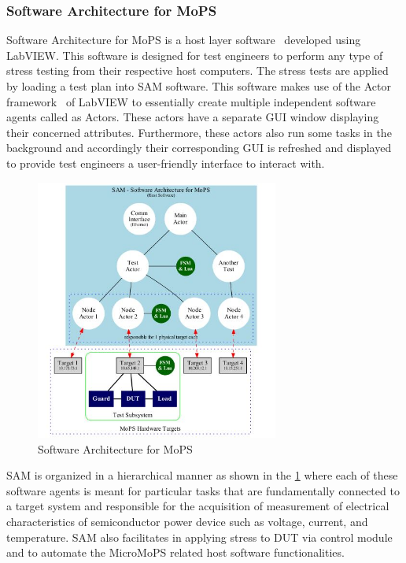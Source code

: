 \subsubsection{Software Architecture for MoPS}\label{sec:SAM}
Software Architecture for MoPS is a host layer software~\cite{Steinwender2016} developed using LabVIEW.
This software is designed for test engineers to perform any type of stress testing from their respective host computers.
The stress tests are applied by loading a test plan into SAM software. 
This software makes use of the Actor framework~\cite{ActorFramework2012} of LabVIEW to essentially create multiple independent software agents called as Actors. 
These actors have a separate GUI window displaying their concerned attributes. 
Furthermore, these actors also run some tasks in the background and accordingly their corresponding GUI is refreshed and displayed to provide test engineers a user-friendly interface to interact with. 


\begin{figure}
		\centering
		\includegraphics[trim=0 0 0 0, clip, width=80mm]{images/SAM.JPG}
		\caption{Software Architecture for MoPS}
		\label{fig:SAM}
\end{figure}

SAM is organized in a hierarchical manner as shown in the \cref{fig:SAM} where each of these software agents is meant for particular tasks that are fundamentally connected to a target system and responsible for the acquisition of measurement of electrical characteristics of semiconductor power device such as voltage, current, and temperature. 
SAM also facilitates in applying stress to \acrshort{DUT} via control module and to automate the MicroMoPS related host software functionalities.

